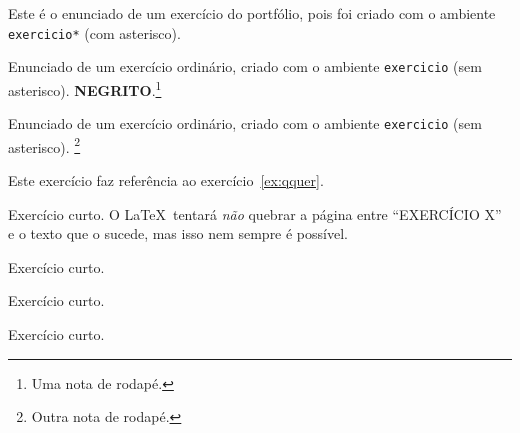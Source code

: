 \documentclass[a4paper]{article}
\begin{document}
\maketitle

\begin{exercicio*}
  Este é o enunciado de um exercício do portfólio, pois foi criado com o ambiente \texttt{exercicio*} (com asterisco).
\end{exercicio*}

\begin{exercicio}
  \label{ex:qquer}
  Enunciado de um exercício ordinário, criado com o ambiente \texttt{exercicio} (sem asterisco).
  \textbf{\MakeUppercase{Negrito}}.\footnote{Uma nota de rodapé.}
\end{exercicio}

\begin{exercicio}
  \begin{compactenum}
  \item Enunciado de um exercício ordinário, criado com o ambiente \texttt{exercicio} (sem asterisco).
  \footnote{Outra nota de rodapé.}
  \end{compactenum}
\end{exercicio}

\begin{exercicio}
  Este exercício faz referência ao exercício~\ref{ex:qquer}.
\end{exercicio}

\begin{exercicio}
  \lipsum[1-20]
\end{exercicio}

\begin{exercicio}
  Exercício curto.
  O \LaTeX\ tentará \emph{não} quebrar a página entre ``EXERCÍCIO X'' e o texto que o sucede, mas isso nem sempre é possível.
\end{exercicio}

\begin{exercicio}
  Exercício curto.
\end{exercicio}

\begin{exercicio}
  Exercício curto.
\end{exercicio}

\begin{exercicio}
  Exercício curto.
\end{exercicio}
\end{document}
